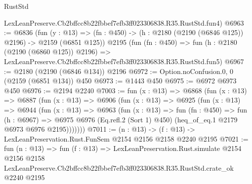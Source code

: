 \begin{lexlean}{RustStd}
\begin{coremodule}
    LexLeanPreserve.Cb2bffcc8b22fbbef7efb3ff023306838.R35.RustStd.fun4)
@6963 := @6836
    (fun (y : @13) => (fn : @450) -> (h : @2180 (@2190 (@6846 @125)) @2196) -> @2159 (@6851 @125))
    @2195
    (fun (fn : @450) =>
    fun (h : @2180 (@2190 (@6860 @125)) @2196) =>
    LexLeanPreserve.Cb2bffcc8b22fbbef7efb3ff023306838.R35.RustStd.fun5)
@6967 := @2180 (@2190 (@6846 @134)) @2196
@6972 := Option.noConfusion.{0, 0} (@2159 (@6851 @134)) @450
@6973 := @1443 @450
@6975 := @6972 @6973 @450
@6976 := @2194 @2240
@7003 := fun (x : @13) =>
  @6868
    (fun (x : @13) =>
    @6887
      (fun (x : @13) =>
      @6906
        (fun (x : @13) =>
        @6925
          (fun (x : @13) =>
          @6944
            (fun (x : @13) =>
            @6963
              (fun (x : @13) =>
              fun (fn : @450) =>
              fun (h : @6967) =>
              @6975 @6976 (Eq.refl.{2} (Sort 1) @450) (heq_of_eq.{1} @2179 @6973 @6976 @2195)))))))
@7011 := (n : @13) -> (f : @13) -> LexLeanPreservation.Rust.FunSem @2154 @2156 @2158 @2240 @2195
@7021 := fun (n : @13) =>
  fun (f : @13) =>
  LexLeanPreservation.Rust.simulate
    @2154
    @2156
    @2158
    LexLeanPreserve.Cb2bffcc8b22fbbef7efb3ff023306838.R35.RustStd.crate_ok
    @2240
    @2195
\end{coremodule}
\end{lexlean}
